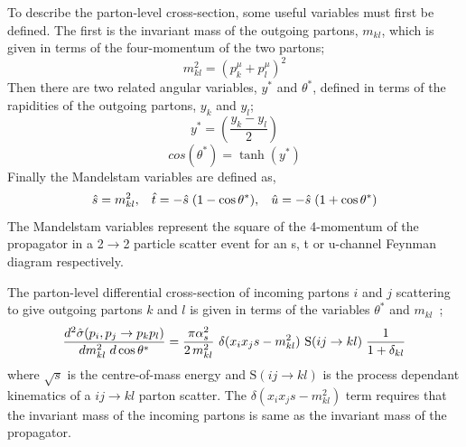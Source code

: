 To describe the parton-level cross-section, some useful variables must first be defined.
The first is the invariant mass of the outgoing partons, $m_{kl}$, which is given in terms of the four-momentum of the two partons;
\begin{equation}
  m_{kl}^2 = (p^\mu_k + p^\mu_l)^2  
\end{equation}
\noindent
Then there are two related angular variables, $y^*$ and $\theta^*$,
defined in terms of the rapidities of the outgoing partons, $y_k$ and $y_l$;
\begin{equation}
  y^* = (\frac{y_k - y_l}{2})
\end{equation}
\begin{equation}
  cos(\theta^*) = \tanh(y^*)
\end{equation}
\noindent
Finally the Mandelstam variables are defined as, %
\begin{equation}
  \hat{s} = m_{kl}^2, \hspace{3mm}  \hat{t} = -\hat{s}\hspace{1mm}(1 - \cos{\theta^*}), \hspace{3mm} \hat{u} = - \hat{s}\hspace{1mm}(1+\cos{\theta^*})
  \label{eqn:theo-mandy}
\end{equation}
The Mandelstam variables represent the square of the 4-momentum of the propagator in a 2$\to$2 particle scatter event
for an s, t or u-channel Feynman diagram respectively.

\noindent
The parton-level differential cross-section of incoming partons $i$ and $j$ scattering to give
outgoing partons $k$ and $l$ is given in terms of the variables $\theta^*$ and $m_{kl}$~\cite{theo-qcd_xs};
\begin{equation}
  \frac{d^2 \hat{\sigma}(p_i, p_j \to p_k p_l)}{dm_{kl}^{2}\hspace{1mm}d\cos{\theta^*}} = \frac{ \pi \alpha_s^2}{2 \,  m_{kl}^2}
  \ \delta(x_i x_j s - m_{kl}^{2})\ \text{S}(ij \to kl) \hspace{1mm} \frac{1}{1+\delta_{kl}}
  \label{eq:theo-qcd_dijet_xs}
\end{equation}
where $\sqrt{s}$ is the centre-of-mass energy and $\text{S}(ij \to kl)$ is the process dependant kinematics of a $ij \to kl$ parton scatter.
The $\delta(x_i x_j s - m_{kl}^{2})$ term requires that the invariant mass of the incoming partons is same as the invariant mass of the propagator.


